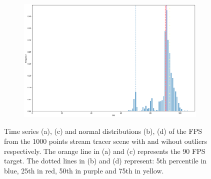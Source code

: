 \begin{figure}[t]
\begin{subfigure}{.45\textwidth}
        \caption{}
    \end{subfigure}
    \begin{subfigure}{.45\textwidth}
        \centering
        \includegraphics[width=\textwidth]{pictures/analysis stream tracer 1000/output_14_0.png}
        \caption{}
    \end{subfigure}
    \caption{Time series (a), (c) and normal distributions (b), (d) of the FPS from the 1000 points stream tracer scene with and wihout outliers respectively. The orange line in (a) and (c) represents the 90 FPS target. The dotted lines in (b) and (d) represent: 5th percentile in blue, 25th in red, 50th in purple and 75th in yellow.}
    \label{fig:stream-tracer-1000-analysis}
\end{figure}

